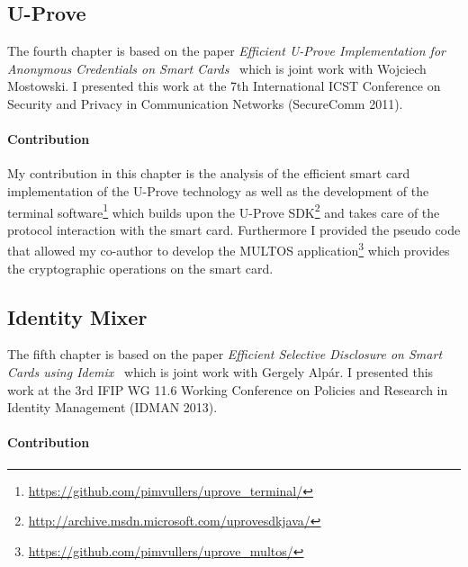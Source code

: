 \subsection{U-Prove}

The fourth chapter is based on the paper \emph{Efficient U-Prove Implementation
for Anonymous Credentials on Smart Cards}~\cite{MostowskiVullers11} which is
joint work with Wojciech Mostowski. I presented this work at the 7th
International ICST Conference on Security and Privacy in Communication Networks
(SecureComm 2011).

\paragraph{Contribution}

My contribution in this chapter is the analysis of the efficient smart card
implementation of the U-Prove technology as well as the development of the
terminal software\footnote{\url{https://github.com/pimvullers/uprove_terminal/}}
which builds upon the U-Prove SDK\footnote{\url{http://archive.msdn.microsoft.com/uprovesdkjava/}}
and takes care of the protocol interaction with the smart card. Furthermore I
provided the pseudo code that allowed my co-author to develop the MULTOS
application\footnote{\url{https://github.com/pimvullers/uprove_multos/}} which
provides the cryptographic operations on the smart card.

\subsection{Identity Mixer}

The fifth chapter is based on the paper \emph{Efficient Selective Disclosure on
Smart Cards using Idemix}~\cite{VullersAlpar2013} which is joint work with
Gergely Alp\'ar. I presented this work at the 3rd IFIP WG 11.6 Working
Conference on Policies and Research in Identity Management (IDMAN 2013).

\paragraph{Contribution}

